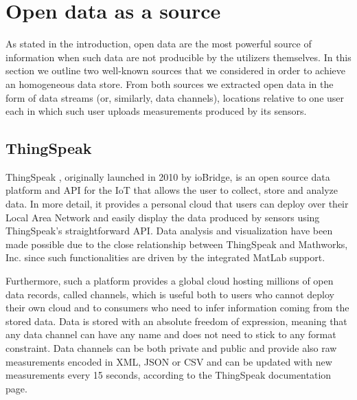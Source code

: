 \section{Open data as a source}
\label{sec:open}

As stated in the introduction, open data are the most powerful source of information when such data are not producible by the utilizers themselves.
In this section we outline two well-known sources that we considered in order to achieve an homogeneous data store.
From both sources we extracted open data in the form of data streams (or, similarly, data channels), locations relative to one user each in which such user uploads measurements produced by its sensors.

\subsection{ThingSpeak}
ThingSpeak \cite{thingspeak}, originally launched in 2010 by ioBridge, is an open source data platform and API for the IoT that allows the user to collect, store and analyze data.
In more detail, it provides a personal cloud that users can deploy over their Local Area Network and easily display the data produced by sensors using ThingSpeak's straightforward API.
Data analysis and visualization have been made possible due to the close relationship between ThingSpeak and Mathworks, Inc. since such functionalities are driven by the integrated MatLab support. 

Furthermore, such a platform provides a global cloud hosting millions of open data records, called channels, which is useful both to users who cannot deploy their own cloud and to consumers who need to infer information coming from the stored data.
Data is stored with an absolute freedom of expression, meaning that any data channel can have any name and does not need to stick to any format constraint.
Data channels can be both private and public and provide also raw measurements encoded in XML, JSON or CSV and can be updated with new measurements every 15 seconds, according to the ThingSpeak documentation page.

